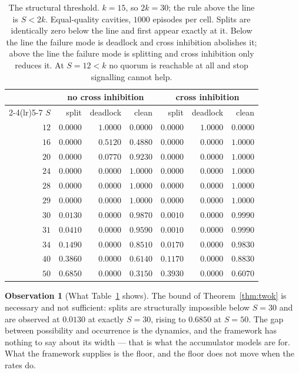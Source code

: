 \documentclass[11pt,a4paper]{article}
\theoremstyle{plain}
\theoremstyle{definition}
\newtheorem{observation}[theorem]{Observation}
\theoremstyle{remark}
\begin{document}
\begin{table}[t]
\centering
\begin{tabular}{@{}rrrrrrr@{}}
\toprule
& \multicolumn{3}{c}{no cross inhibition} & \multicolumn{3}{c}{cross inhibition}\\
\cmidrule(lr){2-4}\cmidrule(lr){5-7}
$S$ & split & deadlock & clean & split & deadlock & clean\\
\midrule
$12$ & $0.0000$ & $1.0000$ & $0.0000$ & $0.0000$ & $1.0000$ & $0.0000$\\
$16$ & $0.0000$ & $0.5120$ & $0.4880$ & $0.0000$ & $0.0000$ & $1.0000$\\
$20$ & $0.0000$ & $0.0770$ & $0.9230$ & $0.0000$ & $0.0000$ & $1.0000$\\
$24$ & $0.0000$ & $0.0000$ & $1.0000$ & $0.0000$ & $0.0000$ & $1.0000$\\
$28$ & $0.0000$ & $0.0000$ & $1.0000$ & $0.0000$ & $0.0000$ & $1.0000$\\
$29$ & $0.0000$ & $0.0000$ & $1.0000$ & $0.0000$ & $0.0000$ & $1.0000$\\
\midrule
$30$ & $0.0130$ & $0.0000$ & $0.9870$ & $0.0010$ & $0.0000$ & $0.9990$\\
$31$ & $0.0410$ & $0.0000$ & $0.9590$ & $0.0010$ & $0.0000$ & $0.9990$\\
$34$ & $0.1490$ & $0.0000$ & $0.8510$ & $0.0170$ & $0.0000$ & $0.9830$\\
$40$ & $0.3860$ & $0.0000$ & $0.6140$ & $0.1170$ & $0.0000$ & $0.8830$\\
$50$ & $0.6850$ & $0.0000$ & $0.3150$ & $0.3930$ & $0.0000$ & $0.6070$\\
\bottomrule
\end{tabular}
\caption{The structural threshold. $k = 15$, so $2k = 30$; the rule above the
line is $S < 2k$. Equal-quality cavities, $1000$ episodes per cell. Splits are
identically zero below the line and first appear exactly at it. Below the line
the failure mode is deadlock and cross inhibition abolishes it; above the line
the failure mode is splitting and cross inhibition only reduces it. At $S = 12
< k$ no quorum is reachable at all and stop signalling cannot help.}
\label{tab:twok}
\end{table}

\begin{observation}[What Table~\ref{tab:twok} shows]\label{obs:twokmeasured}
The bound of Theorem~\ref{thm:twok} is necessary and not sufficient: splits are
structurally impossible below $S = 30$ and are observed at $0.0130$ at exactly
$S = 30$, rising to $0.6850$ at $S = 50$. The gap between possibility and
occurrence is the dynamics, and the framework has nothing to say about its
width --- that is what the accumulator models are for. What the framework
supplies is the floor, and the floor does not move when the rates do.
\end{observation}
\end{document}
